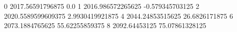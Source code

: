 0 2017.56591796875 0.0
1 2016.986572265625 -0.579345703125
2 2020.5589599609375 2.9930419921875
4 2044.24853515625 26.6826171875
6 2073.1884765625 55.62255859375
8 2092.64453125 75.07861328125
